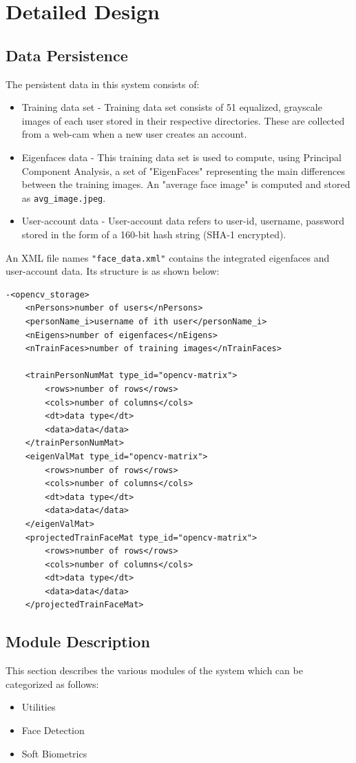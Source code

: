 \documentclass[12pt]{article}			%
\begin{document}
\section{ Detailed Design }
\subsection{ Data Persistence }
The persistent data in this system consists of:
\begin{itemize}
\item Training data set - Training data set consists of 51 equalized, grayscale images of each user stored in their respective directories. These are collected from a web-cam when a new user creates an account.%
\item Eigenfaces data - This training data set is used to compute, using Principal Component Analysis, a set of "EigenFaces" representing the main differences between the training images. An "average face image" is computed and stored as \verb+avg_image.jpeg+. 
\item User-account data - User-account data refers to user-id, username, password stored in the form of a 160-bit hash string (SHA-1 encrypted).
\end{itemize}

An XML file names \verb+"face_data.xml"+ contains the integrated eigenfaces and user-account data. Its structure is as shown below:
\begin{verbatim}
-<opencv_storage>
	<nPersons>number of users</nPersons>
	<personName_i>username of ith user</personName_i>
	<nEigens>number of eigenfaces</nEigens>
	<nTrainFaces>number of training images</nTrainFaces>
	
	<trainPersonNumMat type_id="opencv-matrix">
		<rows>number of rows</rows>
		<cols>number of columns</cols>
		<dt>data type</dt>
		<data>data</data>
	</trainPersonNumMat>
	<eigenValMat type_id="opencv-matrix">
		<rows>number of rows</rows>
		<cols>number of columns</cols>
		<dt>data type</dt>
		<data>data</data>
	</eigenValMat>
	<projectedTrainFaceMat type_id="opencv-matrix">
		<rows>number of rows</rows>
		<cols>number of columns</cols>
		<dt>data type</dt>
		<data>data</data>
	</projectedTrainFaceMat>
\end{verbatim}

\subsection{ Module Description }
This section describes the various modules of the system which can be categorized as follows:
\begin{itemize}
\item Utilities
\item Face Detection
\item Soft Biometrics
\end{itemize}
\end{document}
